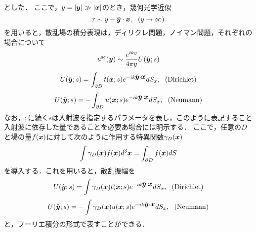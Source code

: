 とした．
ここで，$y=\left|\mbox{\boldmath $y$}\right|\gg \left| \mbox{\boldmath $x$} \right|$のとき，幾何光学近似
\begin{equation}
	r\sim  y  -\hat{\fat{y}}\cdot \fat{x}, \ \ (y\rightarrow \infty)
	\label{eqn:para}
\end{equation}
を用いると，散乱場の積分表現は，ディリクレ問題，ノイマン問題，それぞれの場合について
\begin{equation}
	u^{\rm sc}(\mbox{\boldmath $y$}) \sim \frac{e^{iky}}{4\pi y} U(\hat{\mbox{\boldmath $y$}};s)  
	\label{eqn:}
\end{equation}
\begin{equation}
	U(\hat{\mbox{\boldmath $y$}};s)  = \int _{\partial D} t(\mbox{\boldmath $x$};s)e^{-ik\hat{\mbox{\boldmath $y$}}\cdot \mbox{\boldmath $x$}} dS_x
	, \ \ ( {\rm Dirichlet})
	\label{eqn:}
\end{equation}
\begin{equation}
	U(\hat{\mbox{\boldmath $y$}};s)  =-\int _{\partial D} u(\mbox{\boldmath $x$};s)e^{-ik\hat{\mbox{\boldmath $y$}}\cdot \mbox{\boldmath $x$}} dS_x
	, \ \ ({\rm Neumann})
	\label{eqn:}
\end{equation}
なお，$;$に続く$s$は入射波を指定するパラメータを表し，このように表記すること
入射波に依存した量であることを必要あ場合には明示する．
ここで，任意の$D$と場の量$f(\mbox{\boldmath $x$})$に対して次のように作用する特異関数$\gamma_D(\mbox{\boldmath $x$})$
\begin{equation}
	\int \gamma_D(\mbox{\boldmath $x$})f(\mbox{\boldmath $x$})d^3\mbox{\boldmath $x$} =\int _{\partial D} f(\mbox{\boldmath $x$}) dS
	\label{eqn:}
\end{equation}
を導入する．これを用いると，散乱振幅を
\begin{equation}
	U(\hat{\mbox{\boldmath $y$}};s)  = \int \gamma_D(\mbox{\boldmath $x$})t(\mbox{\boldmath $x$};s)e^{-ik\hat{\mbox{\boldmath $y$}}\cdot \mbox{\boldmath $x$}} dS_x
	, \ \ ( {\rm Dirichlet})
	\label{eqn:}
\end{equation}
\begin{equation}
	U(\hat{\mbox{\boldmath $y$}};s)  =-\int \gamma_D(\mbox{\boldmath $x$})u(\mbox{\boldmath $x$};s)e^{-ik\hat{\mbox{\boldmath $y$}}\cdot \mbox{\boldmath $x$}} dS_x
	, \ \ ({\rm Neumann})
	\label{eqn:}
\end{equation}
と，フーリエ積分の形式で表すことができる．


